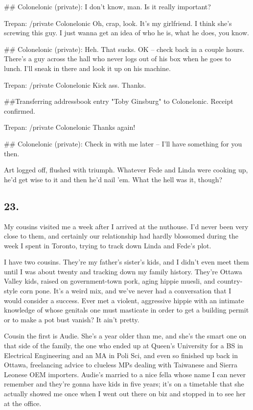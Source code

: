 \#\# Colonelonic (private): I don't know, man. Is it really
important?

Trepan: /private Colonelonic Oh, crap, look. It's my girlfriend. I
think she's screwing this guy. I just wanna get an idea of who he
is, what he does, you know.

\#\# Colonelonic (private): Heh. That sucks. OK -- check back in a
couple hours. There's a guy across the hall who never logs out of
his box when he goes to lunch. I'll sneak in there and look it up
on his machine.

Trepan: /private Colonelonic Kick ass. Thanks.

\#\#Transferring addressbook entry "Toby Ginsburg" to Colonelonic.
Receipt confirmed.

Trepan: /private Colonelonic Thanks again!

\#\# Colonelonic (private): Check in with me later -- I'll have
something for you then.

Art logged off, flushed with triumph. Whatever Fede and Linda were
cooking up, he’d get wise to it and then he’d nail ’em. What the
hell was it, though?

\subsection{23.}

My cousins visited me a week after I arrived at the nuthouse. I’d
never been very close to them, and certainly our relationship had
hardly blossomed during the week I spent in Toronto, trying to
track down Linda and Fede’s plot.

I have two cousins. They’re my father’s sister’s kids, and I didn’t
even meet them until I was about twenty and tracking down my family
history. They’re Ottawa Valley kids, raised on government-town
pork, aging hippie muesli, and country-style corn pone. It’s a
weird mix, and we’ve never had a conversation that I would consider
a success. Ever met a violent, aggressive hippie with an intimate
knowledge of whose genitals one must masticate in order to get a
building permit or to make a pot bust vanish? It ain’t pretty.

Cousin the first is Audie. She’s a year older than me, and she’s
the smart one on that side of the family, the one who ended up at
Queen’s University for a BS in Electrical Engineering and an MA in
Poli Sci, and even so finished up back in Ottawa, freelancing
advice to clueless MPs dealing with Taiwanese and Sierra Leonese
OEM importers. Audie’s married to a nice fella whose name I can
never remember and they’re gonna have kids in five years; it’s on a
timetable that she actually showed me once when I went out there on
biz and stopped in to see her at the office.

